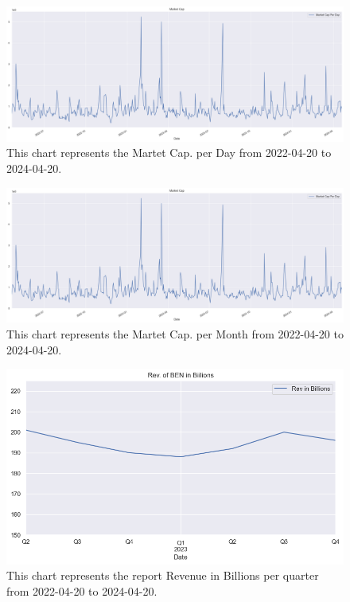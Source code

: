\documentclass[9pt,a4paper,twoside]{tau}
\begin{document}
        
        
        \begin{figure}[H]
                \centering
                \includegraphics[width=0.85\columnwidth]{images/MarketCap1d.png}
                \caption{This chart represents the Martet Cap. per Day from 2022-04-20 to 2024-04-20.}
                \label{fig:figure}
            \end{figure}


            \begin{figure}[H]
                \centering
                \includegraphics[width=0.85\columnwidth]{images/MarketCap1d.png}
                \caption{This chart represents the Martet Cap. per Month from 2022-04-20 to 2024-04-20.}
                \label{fig:figure}
            \end{figure}


            \begin{figure}[H]
                \centering
                \includegraphics[width=0.85\columnwidth]{images/RevInBillions.png}
                \caption{This chart represents the report Revenue in Billions per quarter from 2022-04-20 to 2024-04-20.}
                \label{fig:figure}
            \end{figure}
\end{document}
